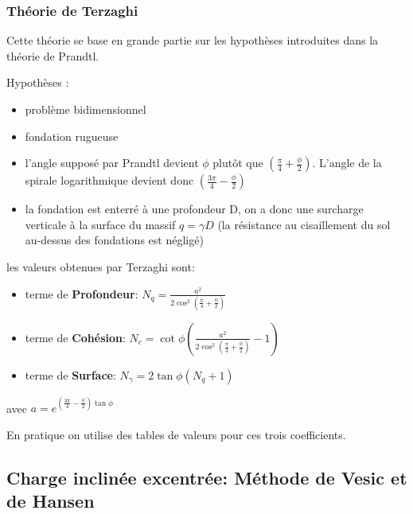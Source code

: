         \subsubsection{Théorie de Terzaghi}
        
            Cette théorie se base en grande partie sur les hypothèses introduites dans la théorie de Prandtl. 
            
            Hypothèses : \begin{itemize}
                \item problème bidimensionnel
                \item fondation rugueuse
                \item l'angle supposé par Prandtl devient $\phi$ plutôt que $(\frac{\pi}{4} + \frac{\phi}{2})$. L'angle de la spirale logarithmique devient donc $(\frac{3\pi}{4} - \frac{\phi}{2})$
                \item la fondation est enterré à une profondeur D, on a donc une surcharge verticale à la surface du massif $q=\gamma D$ (la résistance au cisaillement du sol au-dessus des fondations est négligé)
            \end{itemize} 
            
            les valeurs obtenues par Terzaghi sont:
            \begin{itemize}
                \item terme de \textbf{Profondeur}: $N_q = \frac{a^2}{2 \cos^2(\frac{\pi}{4} + \frac{\phi}{2})}$
                \item terme de \textbf{Cohésion}: $N_c = \cot \phi (\frac{a^2}{2 \cos^2(\frac{\pi}{4} + \frac{\phi}{2})}-1)$
                \item terme de \textbf{Surface}: $N_{\gamma} = 2 \tan \phi (N_q + 1)$
            \end{itemize}
            
            \begin{center}
            avec $ a = e^{(\frac{3\pi}{4} - \frac{\phi}{2}) \tan \phi}$ 
            \end{center}
            
            En pratique on utilise des tables de valeurs pour ces trois coefficients.
            
    \subsection{Charge inclinée excentrée: Méthode de Vesic et de Hansen}
        
